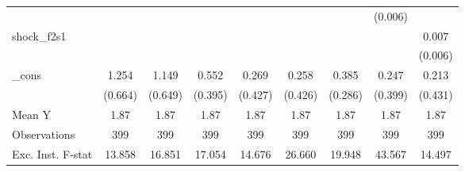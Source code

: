 {\begin{tabular}{l*{8}{c}}
            &                     &                     &                     &                     &                     &                     &     (0.006)         &                     \\
\addlinespace
shock\_f2s1  &                     &                     &                     &                     &                     &                     &                     &       0.007         \\
            &                     &                     &                     &                     &                     &                     &                     &     (0.006)         \\
\addlinespace
\_cons      &       1.254\sym{*}  &       1.149\sym{*}  &       0.552         &       0.269         &       0.258         &       0.385         &       0.247         &       0.213         \\
            &     (0.664)         &     (0.649)         &     (0.395)         &     (0.427)         &     (0.426)         &     (0.286)         &     (0.399)         &     (0.431)         \\
\midrule
Mean Y      &        1.87         &        1.87         &        1.87         &        1.87         &        1.87         &        1.87         &        1.87         &        1.87         \\
Observations&         399         &         399         &         399         &         399         &         399         &         399         &         399         &         399         \\
Exc. Inst. F-stat&      13.858         &      16.851         &      17.054         &      14.676         &      26.660         &      19.948         &      43.567         &      14.497         \\
\bottomrule
\end{tabular}
}
